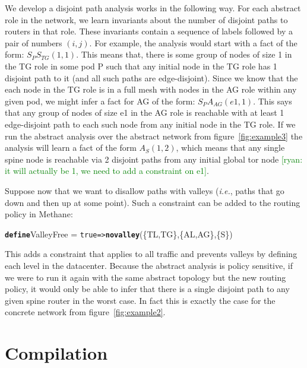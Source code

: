 \documentclass{sig-alternate-10pt}
\newcommand{\ryan}[1]{\textcolor{green}{[ryan: #1]}}
\newcommand{\IE}{\emph{i.e.}}
\newcommand{\sysname}{{\small \sf Methane}\xspace}
\newcommand{\CD}[1]{\texttt{\small #1}}  %
\newcommand{\KW}[1]{\texttt{\small\bfseries{#1}}}
\newcommand{\True}{\CD{true}}
\newcommand{\Define}{\KW{define}}
\newcommand{\Path}{\texttt{=>}}
\newcommand{\Novalley}{\KW{novalley}}
\begin{document}
We develop a disjoint path analysis works in the following way. For each abstract role in the network, we learn invariants about the number of disjoint paths to routers in that role. These invariants contain a sequence of labels followed by a pair of numbers $(i,j)$. For example, the analysis would start with a fact of the form: $S_P S_{TG} (1,1)$. This means that, there is some group of nodes of size 1 in the TG role in some pod P such that any initial node in the TG role has 1 disjoint path to it (and all such paths are edge-disjoint). Since we know that the each node in the TG role is in a full mesh with nodes in the AG role within any given pod, we might infer a fact for AG of the form: $S_P A_{AG}(e1,1)$. This says that any group of nodes of size e1 in the AG role is reachable with at least 1 edge-disjoint path to each such node from any initial node in the TG role.
%
If we run the abstract analysis over the abstract network from figure~\ref{fig:example3} the analysis will learn a fact of the form $A_{S}(1,2)$, which means that any single spine node is reachable via 2 disjoint paths from any initial global tor node \ryan{it will actually be 1, we need to add a constraint on e1}.

Suppose now that we want to disallow paths with valleys (\IE, paths that go down and then up at some point). Such a constraint can be added to the routing policy in \sysname:
\begin{code}
\Define ValleyFree =
    \True \Path \Novalley(\{TL,TG\},\{AL,AG\},\{S\})
\end{code}
\noindent%

This adds a constraint that applies to all traffic and prevents valleys by defining each level in the datacenter.
Because the abstract analysis is policy sensitive, if we were to run it again with the same abstract topology but the new routing policy, it would only be able to infer that there is a single disjoint path to any given spine router in the worst case. In fact this is exactly the case for the concrete network from figure~\ref{fig:example2}.

%
%
%


%
%
%
%

\section{Compilation}
\label{sec:compilation}
\end{document}
